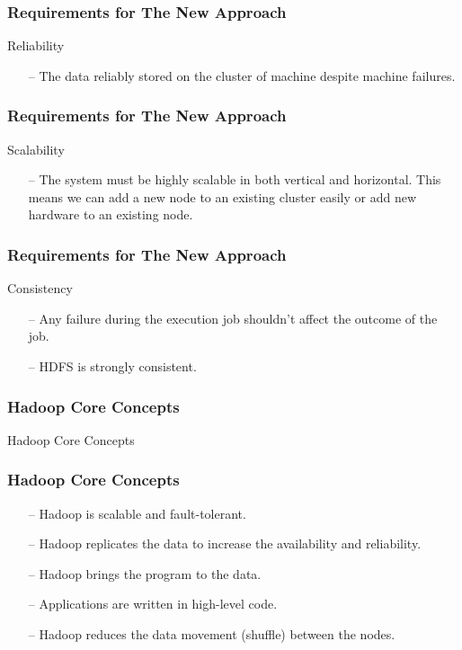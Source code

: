 \begin{frame}[c]{ }
	\frametitle{Requirements for The New Approach }
	Reliability
	\begin{itemize}  [<+->]
		\item [--] {\footnotesize The data reliably stored on the cluster of machine despite machine failures. }		
	\end{itemize}
\end{frame}
\begin{frame}[c]{ }
	\frametitle{Requirements for The New Approach }
	Scalability
	\begin{itemize}  [<+->]
		\item [--] {\footnotesize The system must be highly scalable in both vertical and horizontal. This means we can add a new node to an existing cluster easily or add new hardware to an existing node.}		
	\end{itemize}
\end{frame}
\begin{frame}[c]{ }
	\frametitle{Requirements for The New Approach }
	Consistency
	\begin{itemize}  [<+->]
		\item [--] {\footnotesize Any failure during the execution job shouldn't affect the outcome of the job.}		
		\item [--] {\footnotesize HDFS is strongly consistent.}		
	\end{itemize}
\end{frame}
\begin{frame}[c]{ }
	\frametitle{Hadoop Core Concepts }
	\centering     
	
	\textcolor{offgreen}{ \large Hadoop Core Concepts}
\end{frame}
\begin{frame}[c]{ }
	\frametitle{Hadoop Core Concepts }
	
	
	\begin{itemize}  [<+->]
		\item [--] Hadoop is scalable and fault-tolerant.
		\item [--] Hadoop replicates the data to increase the availability and reliability.
		\item [--] Hadoop brings the program to the data.
		\item [--] Applications are written in high-level code.
		\item [--] Hadoop reduces the data movement (shuffle) between the nodes.
		
	\end{itemize}
\end{frame}
